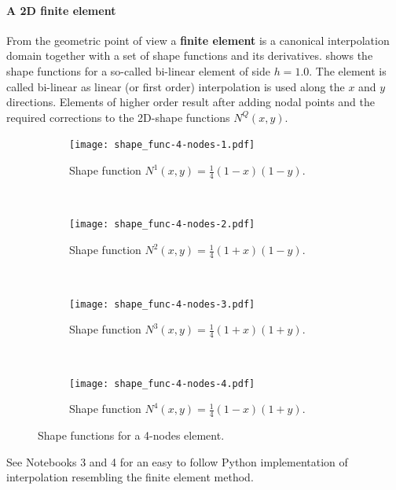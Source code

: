 \paragraph*{A 2D finite element}
From the geometric point of view a {\bf finite element} is a canonical interpolation domain together with a set of shape functions and its derivatives.  shows the shape functions for a so-called bi-linear element of side $h = 1.0$. The element is called bi-linear as linear (or first order) interpolation is used along the $x$ and $y$ directions. Elements of higher order result after adding nodal points and the required corrections to the 2D-shape functions $N^Q(x,y)$.


\begin{figure}[H]
\centering
	\begin{subfigure}[b]{0.45\textwidth}\qquad
		\texttt{[image: shape\_func-4-nodes-1.pdf]}
		\caption{Shape function ${N^1(x,y)=\frac{1}{4}(1-x)(1-y)}$. }
	\end{subfigure}\,
%
	\begin{subfigure}[b]{0.45\textwidth}\qquad
		\texttt{[image: shape\_func-4-nodes-2.pdf]}
		\caption{Shape function ${N^2(x,y)=\frac{1}{4}(1+x)(1-y)}$.}
	\end{subfigure}\\
%
	\begin{subfigure}[b]{0.45\textwidth}\qquad
		\texttt{[image: shape\_func-4-nodes-3.pdf]}
		\caption{Shape function ${N^3(x,y)=\frac{1}{4}(1+x)(1+y)}$.}
	\end{subfigure}\,
%
	\begin{subfigure}[b]{0.45\textwidth}\qquad
		\texttt{[image: shape\_func-4-nodes-4.pdf]}
		\caption{Shape function ${N^4(x,y)=\frac{1}{4}(1-x)(1+y)}$.}
	\end{subfigure}
\caption{Shape functions for a 4-nodes element.}
\label{fig:four-nodes-interp}
\end{figure}

\begin{tcolorbox}

See Notebooks 3 and 4 for an easy to follow Python implementation of interpolation resembling the finite element method.

\end{tcolorbox}



